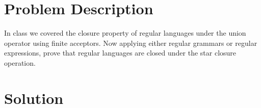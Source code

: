\documentclass{assignment-x}
\begin{document}
\maketitle
\pagebreak

\section{Problem Description}
In class we covered the closure property of regular languages under the union operator using finite acceptors. Now applying either regular grammars or regular expressions, prove that regular languages are closed under the star closure operation.

\section{Solution}
\end{document}
